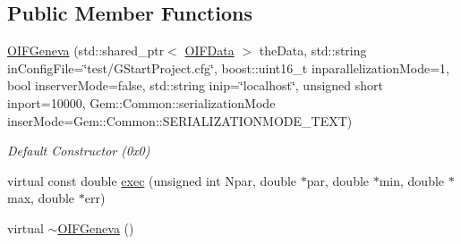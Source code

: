\subsection*{Public Member Functions}
\begin{DoxyCompactItemize}
\item 
\hyperlink{classOIFGeneva_a89e83a814e6571cb875d18cdedf42449}{OIFGeneva} (std::shared\_\-ptr$<$ \hyperlink{classOIFData}{OIFData} $>$ theData, std::string inConfigFile=\char`\"{}test/GStartProject.cfg\char`\"{}, boost::uint16\_\-t inparallelizationMode=1, bool inserverMode=false, std::string inip=\char`\"{}localhost\char`\"{}, unsigned short inport=10000, Gem::Common::serializationMode inserMode=Gem::Common::SERIALIZATIONMODE\_\-TEXT)
\begin{DoxyCompactList}\small\item\em Default Constructor (0x0) \end{DoxyCompactList}\item 
virtual const double \hyperlink{classOIFGeneva_a1a5cf2ace477bd40ce1c4848365a2f13}{exec} (unsigned int Npar, double $\ast$par, double $\ast$min, double $\ast$max, double $\ast$err)
\item 
virtual \hyperlink{classOIFGeneva_a72a8b0d30f8ef7d1d7dbe51a15a412e3}{$\sim$OIFGeneva} ()
\end{DoxyCompactItemize}
